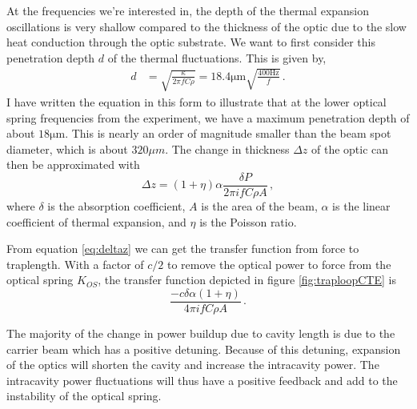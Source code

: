 At the frequencies we're interested in, the depth of the thermal expansion
oscillations is very shallow compared to the thickness of the optic due to
the slow heat conduction through the optic substrate.
We want to first consider this penetration depth $d$ of the thermal
fluctuations. This is given by,
\begin{align}
\label{eq:pendepth}
d &= \sqrt{\frac{\kappa}{2\pi fC\rho}} = 18.4 \mathrm{\mu m}
     \sqrt{\frac{400 \mathrm{Hz}}{f}} \,.
\end{align}
I have written the equation in this form to illustrate that at the lower
optical spring frequencies from the experiment, we have a maximum penetration
depth of about $18\mathrm{\mu m}$.
This is nearly an order of magnitude smaller than the beam spot diameter, which
is about $320\mu m$. The change in thickness $\Delta z$ of the optic can then
be approximated with
\begin{equation} \label{eq:deltaz}
\Delta z = \left(1+\eta\right)\alpha\frac{ \delta P }{2\pi ifC\rho A} \, ,
\end{equation}
where $\delta$ is the absorption coefficient, $A$ is the area of the beam,
$\alpha$ is the linear coefficient of thermal expansion, and $\eta$ is the
Poisson ratio.

From equation \ref{eq:deltaz} we can get the transfer function from force to
traplength. With a factor of $c/2$ to remove the optical power to force from
the optical spring $K_{OS}$, the transfer function depicted in figure
\ref{fig:traploopCTE} is
\begin{equation}
\frac{-c \delta \alpha \left(1+\eta\right)}{4\pi ifC\rho A} \, .
\end{equation}

The majority of the change in power buildup due to cavity length is due to the
carrier beam which has a positive detuning.
Because of this detuning, expansion of the optics will shorten the cavity and
increase the intracavity power.
The intracavity power fluctuations will thus have a positive feedback and add
to the instability of the optical spring.

